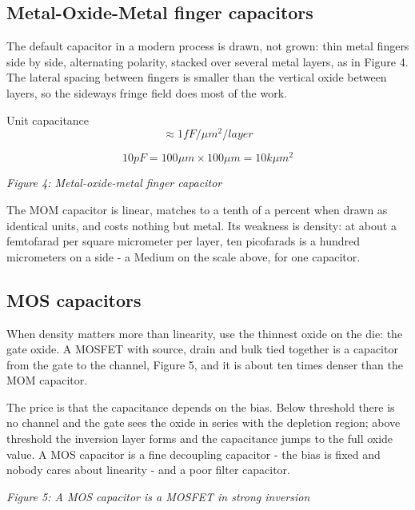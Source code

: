\subsection{Metal-Oxide-Metal finger
capacitors}\label{metal-oxide-metal-finger-capacitors}

The default capacitor in a modern process is drawn, not grown: thin
metal fingers side by side, alternating polarity, stacked over several
metal layers, as in Figure 4. The lateral spacing between fingers is
smaller than the vertical oxide between layers, so the sideways fringe
field does most of the work.

Unit capacitance \[ \approx 1 fF/\mu m^2/layer \]

\[ 10 pF = 100 \mu m \times 100 \mu m = 10 k \mu m^2\]


{
\centering
{}
}

\emph{Figure 4: Metal-oxide-metal finger capacitor}

The MOM capacitor is linear, matches to a tenth of a percent when drawn
as identical units, and costs nothing but metal. Its weakness is
density: at about a femtofarad per square micrometer per layer, ten
picofarads is a hundred micrometers on a side - a Medium on the scale
above, for one capacitor.

\subsection{MOS capacitors}\label{mos-capacitors}

When density matters more than linearity, use the thinnest oxide on the
die: the gate oxide. A MOSFET with source, drain and bulk tied together
is a capacitor from the gate to the channel, Figure 5, and it is about
ten times denser than the MOM capacitor.

The price is that the capacitance depends on the bias. Below threshold
there is no channel and the gate sees the oxide in series with the
depletion region; above threshold the inversion layer forms and the
capacitance jumps to the full oxide value. A MOS capacitor is a fine
decoupling capacitor - the bias is fixed and nobody cares about
linearity - and a poor filter capacitor.


{
\centering
{}
}

\emph{Figure 5: A MOS capacitor is a MOSFET in strong inversion}

